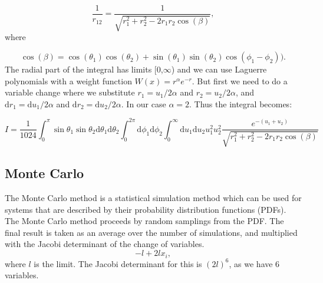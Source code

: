 \documentclass{article}
\begin{document}
\begin{equation}\label{eq:r12}
	\frac{1}{r_{12}}= \frac{1}{\sqrt{r_1^2+r_2^2-2r_1r_2\cos(\beta)}},
\end{equation}
where

\begin{equation*}
	\cos(\beta) = \cos(\theta_1)\cos(\theta_2)+\sin(\theta_1)\sin(\theta_2)\cos(\phi_1-\phi_2)).
\end{equation*}
The radial part of the integral has limits [0,$\infty$) and we can use Laguerre polynomials with a weight function $W(x) = r^{\alpha} e^{-r}$. But first we need to do a variable change where we substitute $r_1 = u_1/2\alpha$ and $r_2 = u_2/2\alpha$, and $\mathrm{d}r_1 = \mathrm{d}u_1/2\alpha$ and $\mathrm{d}r_2 = \mathrm{d}u_2/2\alpha$. In our case $\alpha = 2$. Thus the integral becomes:

\begin{equation}
	I = \frac{1}{1024} \int_0^{\pi} \sin \theta_1 \sin \theta_2 \mathrm{d}\theta_1 \mathrm{d}\theta_2 
	\int_0^{2\pi} \mathrm{d}\phi_1\mathrm{d}\phi_2
	\int_0^{\infty}   \mathrm{d}u_1  \mathrm{d}u_2 u_1^2 u_2^2 \frac{e^{- (u_1 + u_2)}}{\sqrt{r_1^2+r_2^2-2r_1r_2\cos(\beta)}}  
\end{equation}



\subsection{Monte Carlo}
The Monte Carlo method is a statistical simulation method which can be used for systems that are described by their probability distribution functions (PDFs). The Monte Carlo method proceeds by random samplings from the PDF. The final result is taken as an average over the number of simulations, and multiplied with the Jacobi determinant of the change of variables.
\begin{equation}
	-l + 2lx_i,
\end{equation}
where $l$ is the limit. The Jacobi determinant for this is $(2l)^6$, as we have 6 variables.
\end{document}
